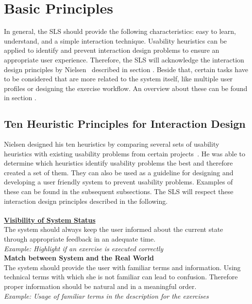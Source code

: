 \section{Basic Principles}\label{4_1_general}
In general, the SLS should provide the following characteristics: easy to learn, understand, and a simple interaction technique.
Usability heuristics can be applied to identify and prevent interaction design problems to ensure an appropriate user experience.
Therefore, the SLS will acknowledge the interaction design principles by Nielsen~\cite{Nielsen_1994-he} described in section \textit{}.
Beside that, certain tasks have to be considered that are more related to the system itself, like multiple user profiles or designing the exercise workflow.
An overview about these can be found in section \textit{}.

\subsection{Ten Heuristic Principles for Interaction Design}\label{nielsenDesignPrinciples}
Nielsen designed his ten heuristics by comparing several sets of usability heuristics with existing usability problems from certain projects~\cite{Nielsen_1994-he}.
He was able to determine which heuristics identify usability problems the best and therefore created a set of them.
They can also be used as a guideline for designing and developing a user friendly system to prevent usability problems.
Examples of these can be found in the subsequent subsections.
The SLS will respect these interaction design principles described in the following.
\\\\
\textbf{\hyperref[4_1_1_visibilitySystemStatus]{Visibility of System Status}}\\
The system should always keep the user informed about the current state through appropriate feedback in an adequate time.\\
\textit{Example: Highlight if an exercise is executed correctly}\\

\textbf{Match between System and the Real World}\\
The system should provide the user with familiar terms and information. Using technical terms with which she is not familiar can lead to confusion. Therefore proper information should be natural and in a meaningful order.\\
\textit{Example: Usage of familiar terms in the description for the exercises}\\

